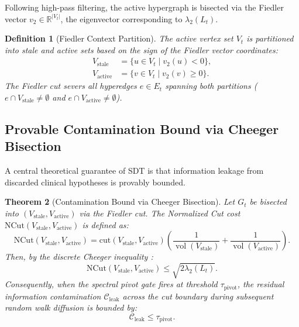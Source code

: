\documentclass[10pt, onecolumn]{article}
\newtheorem{theorem}{Theorem}[section]
\newtheorem{definition}[theorem]{Definition}
\DeclareMathOperator{\vol}{vol}
\newcommand{\R}{\mathbb{R}}
\begin{document}
Following high-pass filtering, the active hypergraph is bisected via the Fiedler vector $v_2 \in \R^{|V_t|}$, the eigenvector corresponding to $\lambda_2(L_t)$.

\begin{definition}[Fiedler Context Partition]
\label{def:fiedler_cut}
The active vertex set $V_t$ is partitioned into stale and active sets based on the sign of the Fiedler vector coordinates:
\begin{align}
  V_{\text{stale}} &= \{u \in V_t \mid v_2(u) < 0\}, \label{eq:v_stale} \\
  V_{\text{active}} &= \{v \in V_t \mid v_2(v) \ge 0\}. \label{eq:v_active}
\end{align}
The Fiedler cut severs all hyperedges $e \in E_t$ spanning both partitions ($e \cap V_{\text{stale}} \ne \emptyset$ and $e \cap V_{\text{active}} \ne \emptyset$).
\end{definition}

\subsection{Provable Contamination Bound via Cheeger Bisection}

A central theoretical guarantee of SDT is that information leakage from discarded clinical hypotheses is provably bounded.

\begin{theorem}[Contamination Bound via Cheeger Bisection]
\label{thm:cheeger_bound}
Let $G_t$ be bisected into $(V_{\text{stale}}, V_{\text{active}})$ via the Fiedler cut. The Normalized Cut cost $\mathrm{NCut}(V_{\text{stale}}, V_{\text{active}})$ is defined as:
\begin{equation}
  \mathrm{NCut}(V_{\text{stale}}, V_{\text{active}}) = \mathrm{cut}(V_{\text{stale}}, V_{\text{active}}) \left( \frac{1}{\vol(V_{\text{stale}})} + \frac{1}{\vol(V_{\text{active}})} \right).
  \label{eq:ncut_def}
\end{equation}
Then, by the discrete Cheeger inequality \cite{chung1997spectral}:
\begin{equation}
  \mathrm{NCut}(V_{\text{stale}}, V_{\text{active}}) \le \sqrt{2 \lambda_2(L_t)}.
  \label{eq:cheeger_ineq}
\end{equation}
Consequently, when the spectral pivot gate fires at threshold $\tau_{\text{pivot}}$, the residual information contamination $\mathcal{C}_{\text{leak}}$ across the cut boundary during subsequent random walk diffusion is bounded by:
\begin{equation}
  \mathcal{C}_{\text{leak}} \le \tau_{\text{pivot}}.
  \label{eq:leakage_bound}
\end{equation}
\end{theorem}
\end{document}
